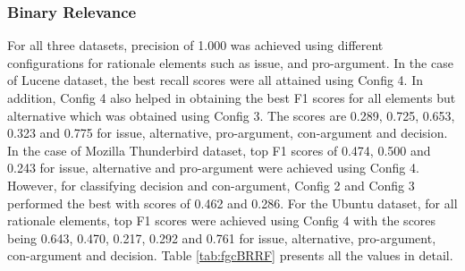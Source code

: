 \documentclass[a4paper,12pt,twoside]{report}
\begin{document}
\subsubsection{Binary Relevance}
For all three datasets, precision of 1.000 was achieved using different configurations for rationale elements such as issue, and pro-argument. In the case of Lucene dataset, the best recall scores were all attained using Config 4. In addition, Config 4 also helped in obtaining the best F1 scores for all elements but alternative which was obtained using Config 3. The scores are 0.289, 0.725, 0.653, 0.323 and 0.775 for issue, alternative, pro-argument, con-argument and decision. In the case of Mozilla Thunderbird dataset, top F1 scores of 0.474, 0.500 and 0.243 for issue, alternative and pro-argument were achieved using Config 4. However, for classifying decision and con-argument, Config 2 and Config 3 performed the best with scores of 0.462 and 0.286. For the Ubuntu dataset, for all rationale elements, top F1 scores were achieved using Config 4 with the scores being 0.643, 0.470, 0.217, 0.292 and 0.761 for issue, alternative, pro-argument, con-argument and decision. Table \ref{tab:fgcBRRF} presents all the values in detail.
\end{document}
